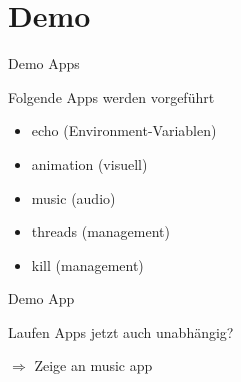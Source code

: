 \section{Demo}

\begin{frame}{Demo Apps}
    \begin{Large}
        Folgende Apps werden vorgeführt
    \end{Large}
    \vspace{15pt}

    \begin{itemize}
        \item echo (Environment-Variablen)
        \item animation (visuell)
        \item music (audio)
        \item threads (management)
        \item kill (management)
    \end{itemize}
    
\end{frame}


\begin{frame}{Demo App}
    \begin{Large}
        Laufen Apps jetzt auch unabhängig?
    \end{Large}
    \vspace{15pt} 
    
    $\Rightarrow$ Zeige an music app
\end{frame}

